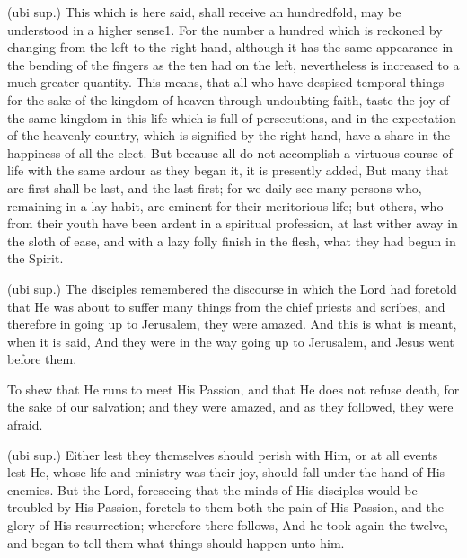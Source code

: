  (ubi sup.) This which is here said, shall receive an hundredfold, may be understood in a higher sense1. For the number a hundred which is reckoned by changing from the left to the right hand, although it has the same appearance in the bending of the fingers as the ten had on the left, nevertheless is increased to a much greater quantity. This means, that all who have despised temporal things for the sake of the kingdom of heaven through undoubting faith, taste the joy of the same kingdom in this life which is full of persecutions, and in the expectation of the heavenly country, which is signified by the right hand, have a share in the happiness of all the elect. But because all do not accomplish a virtuous course of life with the same ardour as they began it, it is presently added, But many that are first shall be last, and the last first; for we daily see many persons who, remaining in a lay habit, are eminent for their meritorious life; but others, who from their youth have been ardent in a spiritual profession, at last wither away in the sloth of ease, and with a lazy folly finish in the flesh, what they had begun in the Spirit.

 

 (ubi sup.) The disciples remembered the discourse in which the Lord had foretold that He was about to suffer many things from the chief priests and scribes, and therefore in going up to Jerusalem, they were amazed. And this is what is meant, when it is said, And they were in the way going up to Jerusalem, and Jesus went before them.

 To shew that He runs to meet His Passion, and that He does not refuse death, for the sake of our salvation; and they were amazed, and as they followed, they were afraid.

 (ubi sup.) Either lest they themselves should perish with Him, or at all events lest He, whose life and ministry was their joy, should fall under the hand of His enemies. But the Lord, foreseeing that the minds of His disciples would be troubled by His Passion, foretels to them both the pain of His Passion, and the glory of His resurrection; wherefore there follows, And he took again the twelve, and began to tell them what things should happen unto him.


